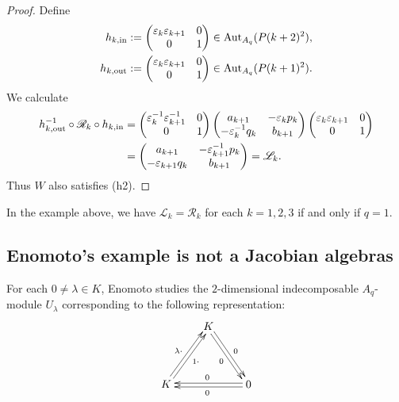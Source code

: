 \documentclass[12pt,reqno]{amsart}
\theoremstyle{definition}
\newcommand{\scL}{{\mathscr L}}
\newcommand{\scR}{{\mathscr R}}
\newcommand{\vep}{\varepsilon}
\newcommand{\Aut}{\operatorname{Aut}}
\begin{document}
\begin{proof}
Define
\begin{align*}
h_{k,{\rm in}} &:=
\left(\begin{matrix} \vep_k\vep_{k+1} & 0\\0&1 \end{matrix}\right)
\in \Aut_{A_q}(P(k+2)^2),
\\
h_{k,{\rm out}} &:= \left(\begin{matrix}
\vep_k\vep_{k+1}& 0\\0&1
\end{matrix}\right) \in \Aut_{A_q}(P(k+1)^2).
\end{align*}
We calculate
\begin{align*}
h_{k,{\rm out}}^{-1} \circ \scR_k \circ h_{k,{\rm in}} 
&=
\left(\begin{matrix}
\vep_k^{-1}\vep_{k+1}^{-1}& 0\\0&1
\end{matrix}\right)
\left(\begin{matrix}
a_{k+1} & -\varepsilon_k p_k
\\
-\varepsilon_k^{-1}q_k & b_{k+1} 
\end{matrix}\right)
\left(\begin{matrix}
\vep_k\vep_{k+1}& 0\\0&1
\end{matrix}\right)
\\
&= \left(\begin{matrix}
a_{k+1} & -\varepsilon_{k+1}^{-1} p_k
\\
-\varepsilon_{k+1}q_k & b_{k+1} 
\end{matrix}\right) = \scL_k.
\end{align*}
Thus $W$ also satisfies (h2).
\end{proof}

In the example above,
we have $\scL_k = \scR_k$ for each $k = 1,2,3$ if and only if $q=1$.

\subsection{Enomoto's example is not a Jacobian algebras}
For each $0 \not= \lambda \in K$, Enomoto studies the $2$-dimensional
indecomposable $A_q$-module
$U_\lambda$ corresponding to the following representation:
\[
\xymatrix@C=8mm@R=14mm{
& K \ar@<0.4ex>[dr]^{0}\ar@<-0.4ex>[dr]_{0}
\\
K \ar@<0.4ex>[ur]^{\lambda \cdot}\ar@<-0.4ex>[ur]_{1 \cdot}
&& 0 \ar@<0.4ex>[ll]^{0}\ar@<-0.4ex>[ll]_{0}
}
\]
\end{document}
